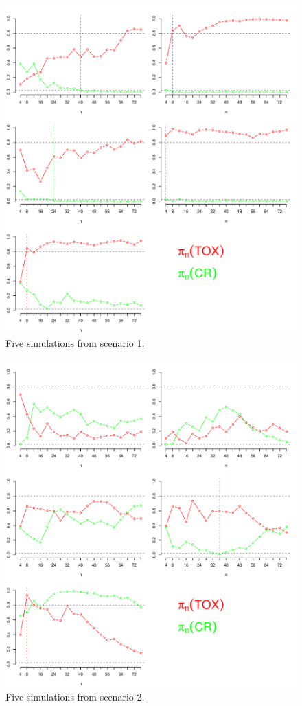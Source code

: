 \documentclass[12pt]{article}
\begin{document}
\begin{figure}[ht]
\centering
\includegraphics[scale=0.75]{figs/scen1.pdf}
\caption{Five simulations from scenario 1.}
\end{figure}

\newpage

\begin{figure}[ht]
\centering
\includegraphics[scale=0.75]{figs/scen2.pdf}
\caption{Five simulations from scenario 2.}
\end{figure}
\end{document}
